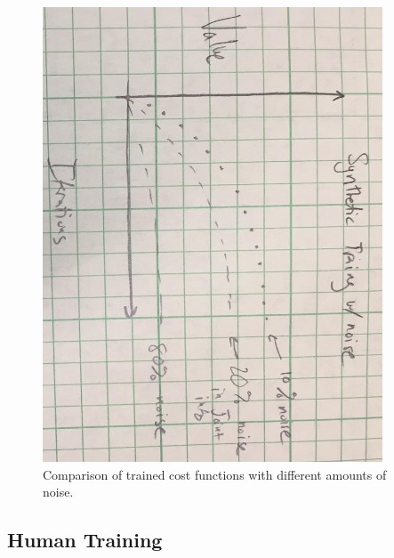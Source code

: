 \begin{figure}[h]
    \centering
    \includegraphics[width=0.9\textwidth]{Images/ToySyntheticNoise.jpg}
    \caption{Comparison of trained cost functions with different amounts of noise.}
    \label{fig:ToySyntheticNoise}
\end{figure}

\subsection{Human Training}

